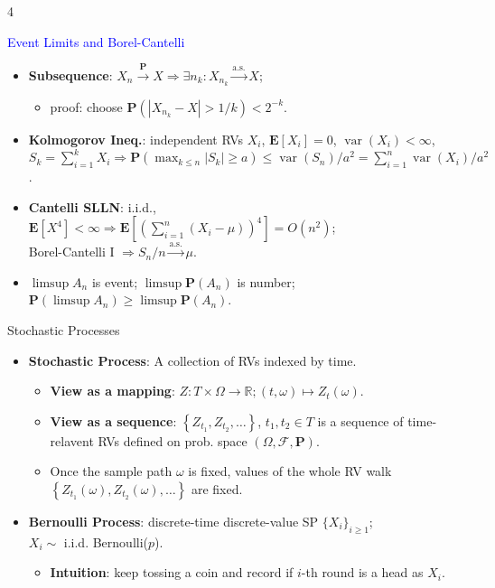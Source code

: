 \documentclass[landscape,a4paper]{article}
\newcommand{\PP}{\mathbf{P}}
\newcommand{\EE}{\mathbf{E}}
\newcommand{\var}{\operatorname{var}}
\begin{document}
\begin{multicols*}{4}
\begin{card}{\textcolor{blue}{Event Limits and Borel-Cantelli}}
{\begin{itemize}
\begin{itemize}
					\item Enough: $\forall m\ge1,\sum_n\PP(|X_n-X|>1/m)<\infty$.
				\end{itemize}
				\item \textbf{Subsequence}: $X_n\xrightarrow{\PP}X\Rightarrow\exists n_k:X_{n_k}\xrightarrow{\mathrm{a.s.}}X$; 
				\begin{itemize}
					\item proof: choose $\PP(|X_{n_k}-X|>1/k)<2^{-k}$.
				\end{itemize}
				\item \textbf{Kolmogorov Ineq.}: independent RVs $X_i$, $\EE[X_i]=0$, $\var(X_i)<\infty$, $S_k=\sum_{i=1}^kX_i\Rightarrow \PP(\max_{k\le n}|S_k|\ge a)\le\var(S_n)/a^2=\sum_{i=1}^n \var(X_i)/a^2$.
				\item \textbf{Cantelli SLLN}: i.i.d., $\EE[X^4]<\infty\Rightarrow \EE[(\sum_{i=1}^n(X_i-\mu))^4]=O(n^2)$;\\Borel-Cantelli I $\Rightarrow S_n/n\xrightarrow{\mathrm{a.s.}}\mu$.
				\item $\limsup A_n$ is event; $\limsup\PP(A_n)$ is number;\\$\PP(\limsup A_n)\ge\limsup\PP(A_n)$.
			\end{itemize}
			}
		\end{card}
		\begin{card}{Stochastic Processes}
			\begin{itemize}
				\item \textbf{Stochastic Process}: A collection of RVs indexed by time.
				\begin{itemize}
					\item \textbf{View as a mapping}: $Z\colon T\times \Omega \to \mathbb{R}; \left(t, \omega\right)\mapsto Z_t(\omega)$.
					\item \textbf{View as a sequence}:
					$\left\{Z_{t_1}, Z_{t_2}, \dots\right\}$, $t_1, t_2\in T$ is a sequence of time-relavent RVs defined on prob. space $\left(\Omega, \mathcal F, \mathbf P\right)$.
					\item Once the sample path $\omega$ is fixed, values of the whole RV walk $\left\{Z_{t_1}(\omega), Z_{t_2}(\omega), \dots\right\}$ are fixed.
				\end{itemize}
				\item \textbf{Bernoulli Process}: discrete-time discrete-value SP $\{X_i\}_{i\ge1}$;\\$X_i\sim$ i.i.d. Bernoulli($p$).
				\begin{itemize}
					\item \textbf{Intuition}: keep tossing a coin and record if $i$-th round is a head as $X_i$.

\end{itemize}
\end{itemize}
\end{card}
\end{multicols*}
\end{document}
